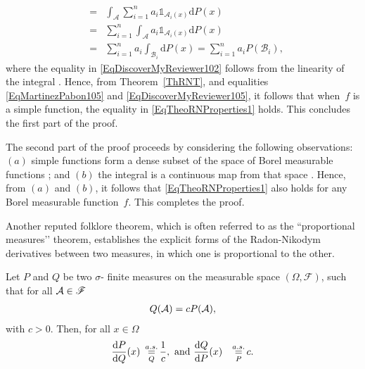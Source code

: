\documentclass[lettersize,onecolumn]{IEEEtran}
\begin{document}
\begin{IEEEproof}
\begin{eqnarray}
&= & \displaystyle\int_{\mathcal{A}} \displaystyle\sum_{i=1}^{n} a_i \mathds{1}_{\mathcal{A}_i (x)} \mathrm{d} P(x) \\
\label{EqDiscoverMyReviewer102}
& =& \displaystyle\sum_{i=1}^{n} \int_{\mathcal{A}} a_i  \mathds{1}_{\mathcal{A}_i (x)}\mathrm{d} P(x)\\
&= & \sum_{i=1}^{n} a_i \int_{\mathcal{B}_i} \mathrm{d} P(x)%
\label{EqDiscoverMyReviewer105}
= \sum_{i=1}^{n} a_i P (\mathcal{B}_i),
\end{eqnarray}
%
where the equality in \eqref{EqDiscoverMyReviewer102} follows from the linearity of the integral \cite[Theorem~1.6.3]
{ash2000probability}. Hence, from Theorem~\ref{ThRNT}, and equalities \eqref{EqMartinezPabon105} and \eqref{EqDiscoverMyReviewer105}, it follows that 
when~$f$ is a simple function, the equality in \eqref{EqTheoRNProperties1} holds.  This concludes the first part of the proof.

The second part of the proof proceeds by considering the following observations: $\left(a\right)$ simple functions form a dense subset of the space of Borel measurable functions  \cite[Theorem~1.5.5(b)]{ash2000probability}; and $\left(b\right)$ the integral is a continuous map from that space \cite[Theorem~1.6.2]{ash2000probability}. Hence, from $\left(a\right)$ and $\left(b\right)$, it follows that \eqref{EqTheoRNProperties1} also holds for any Borel measurable function~$f$.
%
This completes the proof.
\end{IEEEproof}
%
Another reputed  folklore theorem, which  is often referred to as the ``proportional measures’’ theorem, establishes the explicit forms of the Radon-Nikodym derivatives between two measures, in which one is proportional to the other.
%
\begin{theorem}\label{TheoRNDOne}
Let $P$ and $Q$ be two $\sigma$-
finite measures on the measurable space $\left( \Omega, \mathscr{F}\right)$, such that for all $\mathcal A \in \mathscr{F}$
\begin{eqnarray}\label{EqEqualMeasuresUpToConstant}
Q(\mathcal A) = c P (\mathcal A),
\end{eqnarray}
with $c > 0$. Then, for all $x \in \Omega$
\begin{eqnarray}
\label{EqThPropconst}
\frac{\mathrm{d}P}{\mathrm{d}Q} (x) &~\displaystyle\mathop{ \stackrel{a.s.}{=}}_{Q} \frac{1}{c} , \mbox{ and } \frac{\mathrm{d}Q}{\mathrm{d}P} (x) & \displaystyle\mathop{ \stackrel{a.s.}{=}}_{P}  c.
\end{eqnarray}
\end{theorem}
\end{document}
